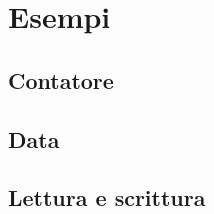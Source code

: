 \chapter{Esempi}
\label{chap:Esempi}

\section{Contatore}
\label{sec:Contatore}

\section{Data}
\label{sec:Data}

\section{Lettura e scrittura}
\label{sec:Lettura e scrittura}
